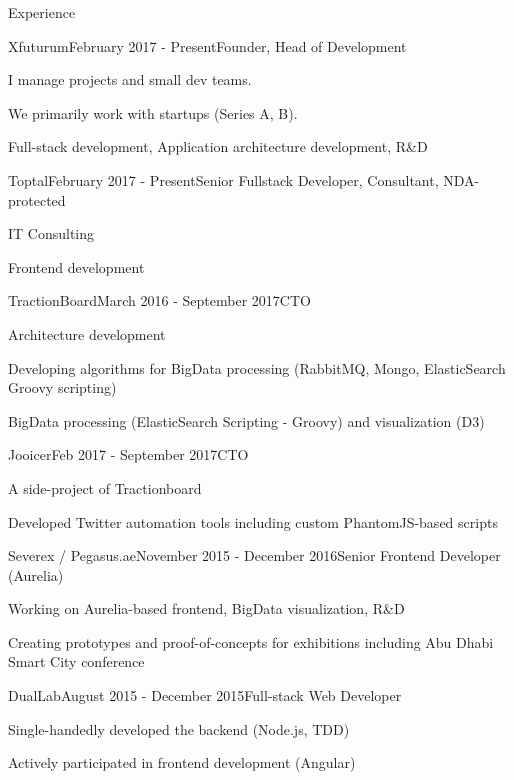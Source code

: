 \documentclass{resume} %
\begin{document}
\begin{rSection}{Experience}

\begin{rSubsection}{Xfuturum}{February 2017 - Present}{Founder, Head of Development}{}
\item I manage projects and small dev teams.
\item We primarily work with startups (Series A, B).
\item Full-stack development, Application architecture development, R\&D
\end{rSubsection}


\begin{rSubsection}{Toptal}{February 2017 - Present}{Senior Fullstack Developer, Consultant, NDA-protected}{}
\item IT Consulting
\item Frontend development
\end{rSubsection}


\begin{rSubsection}{TractionBoard}{March 2016 - September 2017}{CTO}{}
\item Architecture development
\item Developing algorithms for BigData processing (RabbitMQ, Mongo, ElasticSearch Groovy scripting)
\item BigData processing (ElasticSearch Scripting - Groovy) and visualization (D3)
\end{rSubsection}

\begin{rSubsection}{Jooicer}{Feb 2017 - September 2017}{CTO}{}
\item A side-project of Tractionboard
\item Developed Twitter automation tools including custom PhantomJS-based scripts
\end{rSubsection}

\begin{rSubsection}{Severex / Pegasus.ae}{November 2015 - December 2016}{Senior Frontend Developer (Aurelia)}{}
\item Working on Aurelia-based frontend, BigData visualization, R\&D
\item Creating prototypes and proof-of-concepts for exhibitions including Abu Dhabi Smart City conference 
\end{rSubsection}

\begin{rSubsection}{DualLab}{August 2015 - December 2015}{Full-stack Web Developer}{}
\item Single-handedly developed the backend (Node.js, TDD)
\item Actively participated in frontend development (Angular)
\end{rSubsection}


\end{rSection}
\end{document}

